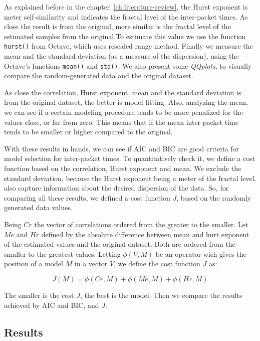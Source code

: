 As explained before in the chapter~\ref{ch:literature-review}, the Hurst exponent is meter self-similarity and indicates the fractal level of the inter-packet times. As close the result is from the original, more similar is the fractal level of the estimated samples from the original.To estimate this value we use the function \texttt{hurst()} from Octave, which uses rescaled range method.
Finally we measure the mean and the standard deviation (as a measure of the dispersion), using the Octave's functions \texttt{mean()} and \texttt{std()}. We also present some \textit{QQplots}, to visually compare the random-generated data and the original dataset. 

As close the correlation, Hurst exponent, mean and the standard deviation is from the original dataset, the better is model fitting. Also, analyzing the mean, we can see if a certain modeling procedure tends to be more penalized for the values close, or far from zero. This means that if the mean inter-packet time tends to be smaller or higher compared to the original. 

With these results in hands, we can see if AIC and BIC are good criteria for model selection for inter-packet times. To quantitatively check it, we define a cost function based on the correlation, Hurst exponent and mean. We exclude the standard deviation, because the Hurst exponent being a meter of the fractal level, also capture information about the desired dispersion of the data. So, for comparing all these results, we defined a cost function $J$, based on the randomly generated data values.

Being $Cr$ the vector of correlations ordered from the greater to the smaller. Let $Me$ and $Hr$ defined by the absolute difference between mean and hurt exponent of the estimated values and the original dataset. Both are ordered from the smaller to the greatest values. Letting $\phi(V, M)$ be an operator wich gives the position of a model $M$ in a vector $V$, we define the cost function $J$ as:


\begin{equation}
J(M) = \phi(Cr, M) + \phi(Me, M) + \phi(Hr, M)
\end{equation}

The smaller is the cost $J$, the best is the model. Then we compare the results achieved by AIC and BIC, and $J$.

\subsection{Results}



